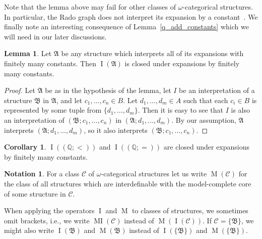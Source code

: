 \documentclass{amsart}
\theoremstyle{definition}
\newtheorem{lemma}[theorem]{Lemma}
\newtheorem{corollary}[theorem]{Corollary}
\newtheorem{notation}[theorem]{Notation}
\theoremstyle{remark}
\numberwithin{equation}{section}
\DeclareMathOperator{\I}{\operatorname{I}}
\DeclareMathOperator{\MI}{\operatorname{MI}}
\DeclareMathOperator{\M}{\operatorname{M}}
\newcommand{\atoms}{({\mathbb Q};=)}
\newcommand{\order}{(\mathbb{Q};<)}
\newcommand{\fa}{\mathfrak{A}}
\newcommand{\fb}{\mathfrak{B}}
\newcommand{\bB}{\mathfrak{B}}
\begin{document}
	Note that the lemma above may fail for other classes of $\omega$-categorical structures. In particular, the Rado graph does not interpret its expansion by a constant~\cite{Radowithconstant}.
	We finally note an interesting consequence of Lemma~\ref{q_add_constants} which we will need in our later discussions. 

\begin{lemma}\label{inter_constants}
	Let $\fa$ be any structure which interprets all of its expansions with finitely many constants. Then $\I(\fa)$ is closed under expansions by finitely many constants.
\end{lemma}

\begin{proof}
	Let $\fa$ be as in the hypothesis of the lemma, let $I$ be an interpretation of a structure $\fb$ in $\fa$, and let $c_1,\dots,c_n\in B$.
    Let $d_1,\dots,d_m\in A$ such that each $c_i\in B$ is represented by some tuple from $\{d_1,\dots,d_m\}$.
    Then it is easy to see that $I$ is also an interpretation of $(\fb;c_1,\dots,c_n)$ in $(\fa;d_1,\dots,d_m)$. %
{By our assumption,} $\fa$ interprets $(\fa; d_1,\dots,d_m)$, so it also interprets $(\fb;c_1,\dots,c_n)$.
\end{proof}

\begin{corollary}\label{q_add_constants2}
	$\I(\order)$ and $\I(\atoms)$ are closed under expansions by finitely many constants.
\end{corollary}


  
\begin{notation}
    For a class $\mathcal{C}$ of 
$\omega$-categorical 
structures let us write
        $\M(\mathcal{C})$ for the class of all structures which are interdefinable with 
the model-complete core of some structure in $\mathcal{C}$.

When applying the operators $\I$ and $\M$ to classes of structures, we sometimes omit brackets, i.e., we write 
    $\MI({\mathcal C})$ instead of $\M(\I({\mathcal C}))$. 
    If ${\mathcal C} = \{\bB\}$, we might also write 
    $\I(\bB)$ and $\M(\bB)$ instead of 
    $\I(\{\bB\})$ and $\M(\{\bB\})$.
\end{notation}
\end{document}
